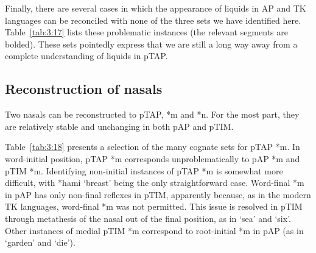 Finally, there are several cases in which the appearance of liquids in AP and TK languages can be reconciled with none of the three sets we have identified here. Table~\ref{tab:3:17} lists these problematic instances (the relevant segments are bolded). These sets pointedly express that we are still a long way away from a complete understanding of liquids in pTAP. 
 

\subsection{Reconstruction of nasals}
Two nasals can be reconstructed to pTAP, *m and *n. For the most part, they are relatively stable and unchanging in both pAP and pTIM.

Table~\ref{tab:3:18} presents a selection of the many cognate sets for pTAP *m. In word-initial position, pTAP *m corresponds unproblematically to pAP *m and pTIM *m. Identifying non-initial instances of pTAP *m is somewhat more difficult, with *hami `breast' being the only straightforward case. Word-final *m in pAP has only non-final reflexes in pTIM, apparently because, as in the modern TK languages, word-final *m was not permitted. This issue is resolved in pTIM through metathesis of the nasal out of the final position, as in `sea' and `six'. Other instances of medial pTIM *m correspond to root-initial *m in pAP (as in `garden' and `die'). 
 
